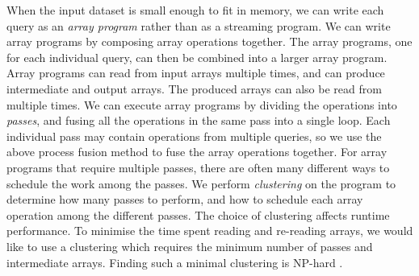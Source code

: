 

When the input dataset is small enough to fit in memory, we can write each query as an \emph{array program} rather than as a streaming program.
We can write array programs by composing array operations together.
The array programs, one for each individual query, can then be combined into a larger array program.
Array programs can read from input arrays multiple times, and can produce intermediate and output arrays.
The produced arrays can also be read from multiple times.
We can execute array programs by dividing the operations into \emph{passes}, and fusing all the operations in the same pass into a single loop. %
Each individual pass may contain operations from multiple queries, so we use the above process fusion method to fuse the array operations together.
For array programs that require multiple passes, there are often many different ways to schedule the work among the passes.
We perform \emph{clustering} on the program to determine how many passes to perform, and how to schedule each array operation among the different passes.
The choice of clustering affects runtime performance.
To minimise the time spent reading and re-reading arrays, we would like to use a clustering which requires the minimum number of passes and intermediate arrays.
Finding such a minimal clustering is NP-hard \cite{darte1999complexity}.

